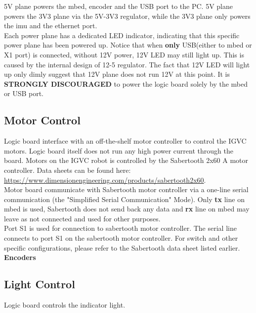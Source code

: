 \documentclass[letterpaper, 12pt]{article}
\begin{document}
5V plane powers the mbed, encoder and the USB port to the PC. 5V plane powers the 3V3 plane
via the 5V-3V3 regulator, while the 3V3 plane only powers the imu and the ethernet port. \\


Each power plane has a dedicated LED indicator, indicating that this specific power plane
has been powered up. Notice that when \textbf{only} USB(either to mbed or X1 port) is connected,
without 12V power, 12V LED may still light up. This is caused by the internal design of 12-5 regulator.
The fact that 12V LED will light up only dimly suggest that 12V plane does not run 12V at this point.
It is \textbf{STRONGLY DISCOURAGED} to power the logic board solely by the mbed or USB port.

\subsection{Motor Control}
Logic board interface with an off-the-shelf motor controller to control the IGVC motors. Logic board itself
does not run any high power current through the board. Motors on the IGVC robot is controlled by the
Sabertooth 2x60 A motor controller. Data sheets can be found here:
\url{https://www.dimensionengineering.com/products/sabertooth2x60}.\\

Motor board communicate with Sabertooth motor controller via a one-line serial communication
(the "Simplified Serial Communication" Mode). Only \textbf{tx} line on mbed is used, Sabertooth
does not send back any data and \textbf{rx} line on mbed may leave as not connected and used
for other purposes.\\

Port S1 is used for connection to sabertooth motor controller. The serial line connects to port
S1 on the sabertooth motor controller. For switch and other specific configurations, please refer
to the Sabertooth data sheet listed earlier. \\

\textbf{Encoders}

\subsection{Light Control}
Logic board controls the indicator light.\\
\end{document}
